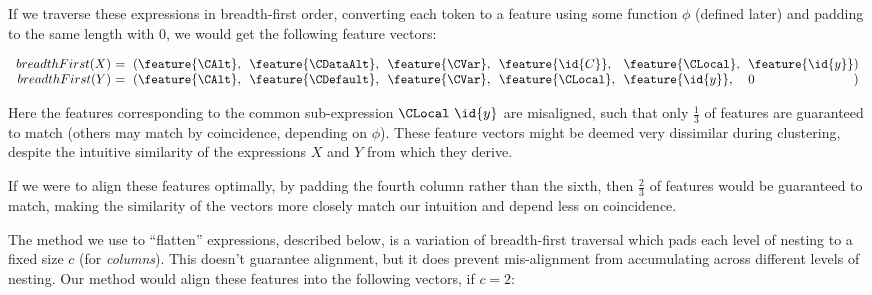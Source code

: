 If we traverse these expressions in breadth-first order, converting each token
to a feature using some function $\phi$ (defined later) and padding to the same
length with $0$, we would get the following feature vectors:

\begin{small}
  \begin{equation*}
    \begin{array}{r@{}l@{}l@{}l@{}l@{}l@{}l@{}l}
      breadthFirst(X)\ &=\ (\feature{\CAlt},\
                           \ &\feature{\CDataAlt},\
                           \ &\feature{\CVar},\
                           \ &\feature{\id{C}},\
                           \ &\feature{\CLocal},\
                           \ &\feature{\id{y}} &) \\
      breadthFirst(Y)\ &=\ (\feature{\CAlt},\
                           \ &\feature{\CDefault},\
                           \ &\feature{\CVar},\
                           \ &\feature{\CLocal},\
                           \ &\feature{\id{y}},\
                           \ &0 &)
    \end{array}
  \end{equation*}
\end{small}

Here the features corresponding to the common sub-expression $\CLocal\ \id{y}$
are misaligned, such that only $\frac{1}{3}$ of features are guaranteed to match
(others may match by coincidence, depending on $\phi$). These feature vectors
might be deemed very dissimilar during clustering, despite the intuitive
similarity of the expressions $X$ and $Y$ from which they derive.

If we were to align these features optimally, by padding the fourth column
rather than the sixth, then $\frac{2}{3}$ of features would be guaranteed to
match, making the similarity of the vectors more closely match our intuition and
depend less on coincidence.

The method we use to ``flatten'' expressions, described below, is a variation of
breadth-first traversal which pads each level of nesting to a fixed size $c$
(for \emph{columns}). This doesn't guarantee alignment, but it does prevent
mis-alignment from accumulating across different levels of nesting. Our method
would align these features into the following vectors, if $c = 2$:

